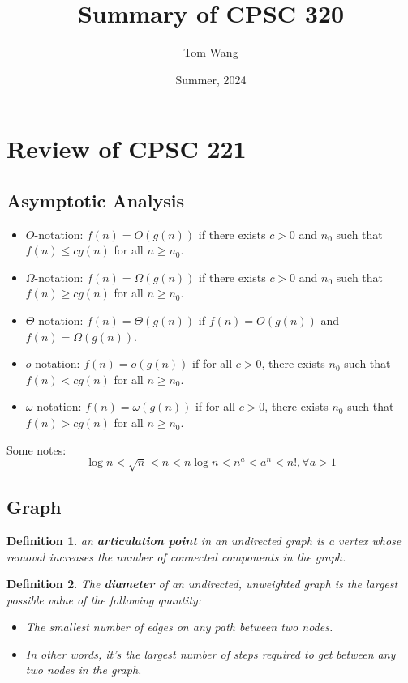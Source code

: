 \documentclass[11pt,fleqn]{article}
\title{Summary of CPSC 320}
\author{Tom Wang}
\date{Summer, 2024}
\newtheorem*{definition}{Definition}
\begin{document}
\maketitle
\thispagestyle{plain}
\section{Review of CPSC 221}
\subsection{Asymptotic Analysis}
\begin{itemize}
    \item $O$-notation: $f(n) = O(g(n))$ if there exists $c > 0$ and $n_0$ such that $f(n) \leq cg(n)$ for all $n \geq n_0$.
    \item $\Omega$-notation: $f(n) = \Omega(g(n))$ if there exists $c > 0$ and $n_0$ such that $f(n) \geq cg(n)$ for all $n \geq n_0$.
    \item $\Theta$-notation: $f(n) = \Theta(g(n))$ if $f(n) = O(g(n))$ and $f(n) = \Omega(g(n))$.
    \item $o$-notation: $f(n) = o(g(n))$ if for all $c > 0$, there exists $n_0$ such that $f(n) < cg(n)$ for all $n \geq n_0$.
    \item $\omega$-notation: $f(n) = \omega(g(n))$ if for all $c > 0$, there exists $n_0$ such that $f(n) > cg(n)$ for all $n \geq n_0$.
\end{itemize}

Some notes:
\[
\log n < \sqrt{n} < n < n \log n < n^a < a^n < n!, \forall a > 1
\]
\subsection{Graph}
\begin{definition}
    an \textbf{articulation point} in an undirected graph is a vertex whose removal increases the number of connected components in the graph.
\end{definition}
\begin{definition}
    The \textbf{diameter} of an undirected, unweighted graph is the largest possible value of the following quantity: \begin{itemize}
        \item The smallest number of edges on any path between two nodes.
        \item In other words, it's the largest number of steps required to get between any two nodes in the graph.
    \end{itemize}
\end{definition}
\end{document}
